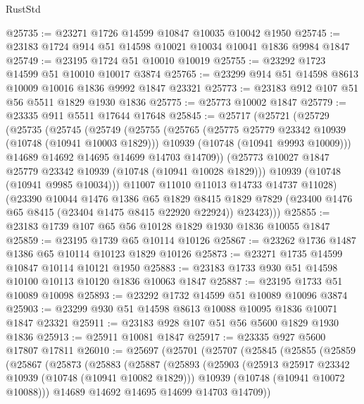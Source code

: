 \begin{lexlean}{RustStd}
\begin{coremodule}
{\begin{coremodule}
{{{{{@25735 := @23271 @1726 @14599 @10847 @10035 @10042 @1950
@25745 := @23183 @1724 @914 @51 @14598 @10021 @10034 @10041 @1836 @9984 @1847
@25749 := @23195 @1724 @51 @10010 @10019
@25755 := @23292 @1723 @14599 @51 @10010 @10017 @3874
@25765 := @23299 @914 @51 @14598 @8613 @10009 @10016 @1836 @9992 @1847 @23321
@25773 := @23183 @912 @107 @51 @56 @5511 @1829 @1930 @1836
@25775 := @25773 @10002 @1847
@25779 := @23335 @911 @5511 @17644 @17648
@25845 := @25717
    (@25721
      (@25729
        (@25735
          (@25745
            (@25749
              (@25755
                (@25765
                  (@25775 @25779 @23342 @10939 (@10748 (@10941 @10003 @1829)))
                  @10939
                  (@10748 (@10941 @9993 @10009)))
                @14689
                @14692
                @14695
                @14699
                @14703
                @14709))
            (@25773 @10027 @1847 @25779 @23342 @10939 (@10748 (@10941 @10028 @1829)))
            @10939
            (@10748 (@10941 @9985 @10034)))
          @11007
          @11010
          @11013
          @14733
          @14737
          @11028)
        (@23390
          @10044
          @1476
          @1386
          @65
          @1829
          @8415
          @1829
          @7829
          (@23400 @1476 @65 @8415 (@23404 @1475 @8415 @22920 @22924))
          @23423)))
@25855 := @23183 @1739 @107 @65 @56 @10128 @1829 @1930 @1836 @10055 @1847
@25859 := @23195 @1739 @65 @10114 @10126
@25867 := @23262 @1736 @1487 @1386 @65 @10114 @10123 @1829 @10126
@25873 := @23271 @1735 @14599 @10847 @10114 @10121 @1950
@25883 := @23183 @1733 @930 @51 @14598 @10100 @10113 @10120 @1836 @10063 @1847
@25887 := @23195 @1733 @51 @10089 @10098
@25893 := @23292 @1732 @14599 @51 @10089 @10096 @3874
@25903 := @23299 @930 @51 @14598 @8613 @10088 @10095 @1836 @10071 @1847 @23321
@25911 := @23183 @928 @107 @51 @56 @5600 @1829 @1930 @1836
@25913 := @25911 @10081 @1847
@25917 := @23335 @927 @5600 @17807 @17811
@26010 := @25697
    (@25701
      (@25707
        (@25845
          (@25855
            (@25859
              (@25867
                (@25873
                  (@25883
                    (@25887
                      (@25893
                        (@25903
                          (@25913 @25917 @23342 @10939 (@10748 (@10941 @10082 @1829)))
                          @10939
                          (@10748 (@10941 @10072 @10088)))
                        @14689
                        @14692
                        @14695
                        @14699
                        @14703
                        @14709))
}}}}}
\end{coremodule}}
\end{coremodule}
\end{lexlean}
